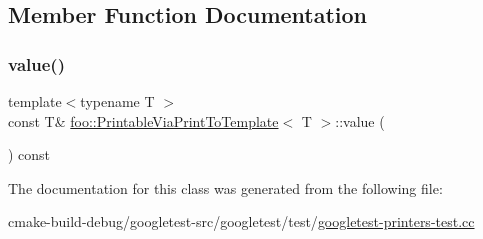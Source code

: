 \subsection{Member Function Documentation}
\mbox{\label{classfoo_1_1PrintableViaPrintToTemplate_a14e0fcac9ae264e37e6212994b2920f6}} 
\subsubsection{\texorpdfstring{value()}{value()}}
{\footnotesize\ttfamily template$<$typename T $>$ \\
const T\& \mbox{\hyperlink{classfoo_1_1PrintableViaPrintToTemplate}{foo\+::\+Printable\+Via\+Print\+To\+Template}}$<$ T $>$\+::value (\begin{DoxyParamCaption}{ }\end{DoxyParamCaption}) const\hspace{0.3cm}{\ttfamily [inline]}}



The documentation for this class was generated from the following file\+:\begin{DoxyCompactItemize}
\item 
cmake-\/build-\/debug/googletest-\/src/googletest/test/\mbox{\hyperlink{googletest-printers-test_8cc}{googletest-\/printers-\/test.\+cc}}\end{DoxyCompactItemize}
